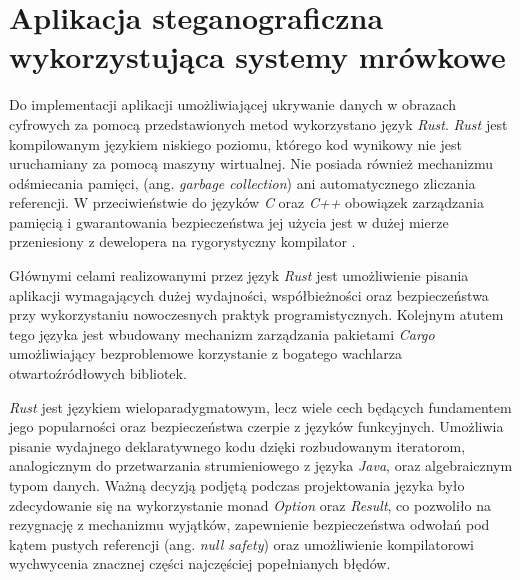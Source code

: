 \chapter{Aplikacja steganograficzna wykorzystująca systemy mrówkowe}\label{chap:implementation}
{

    Do implementacji aplikacji umożliwiającej ukrywanie danych w obrazach cyfrowych za pomocą przedstawionych metod
    wykorzystano język \textit{Rust}. \textit{Rust} jest kompilowanym językiem niskiego poziomu, którego kod wynikowy
    nie jest uruchamiany za pomocą maszyny wirtualnej. Nie posiada również mechanizmu odśmiecania pamięci, (ang.
    \textit{garbage collection}) ani automatycznego zliczania referencji. W przeciwieństwie do języków \textit{C} oraz
    \textit{C++} obowiązek zarządzania pamięcią i gwarantowania bezpieczeństwa jej użycia jest w dużej mierze
    przeniesiony z dewelopera na rygorystyczny kompilator \cite{Cosmin2019RustT, Matsakis2014TheRL, RustHomePage}.

    Głównymi celami realizowanymi przez język \textit{Rust} jest umożliwienie pisania aplikacji wymagających dużej
    wydajności, współbieżności oraz bezpieczeństwa przy wykorzystaniu nowoczesnych praktyk programistycznych. Kolejnym
    atutem tego języka jest wbudowany mechanizm zarządzania pakietami \textit{Cargo} umożliwiający bezproblemowe
    korzystanie z bogatego wachlarza otwartoźródłowych bibliotek.

    \textit{Rust} jest językiem wieloparadygmatowym, lecz wiele cech będących fundamentem jego popularności oraz
    bezpieczeństwa czerpie z języków funkcyjnych. Umożliwia pisanie wydajnego deklaratywnego kodu dzięki rozbudowanym
    iteratorom, analogicznym do przetwarzania strumieniowego z języka \textit{Java}, oraz algebraicznym typom danych.
    Ważną decyzją podjętą podczas projektowania języka było zdecydowanie się na wykorzystanie monad \textit{Option} oraz
    \textit{Result}, co pozwoliło na rezygnację z mechanizmu wyjątków, zapewnienie bezpieczeństwa odwołań pod kątem
    pustych referencji (ang. \textit{null safety}) oraz umożliwienie kompilatorowi wychwycenia znacznej części
    najczęściej popełnianych błędów.

}
